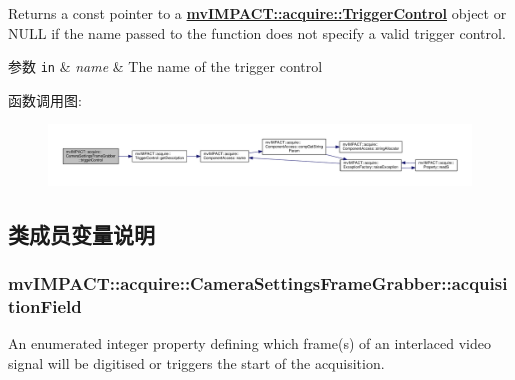 Returns a const pointer to a {\bfseries \hyperlink{classmv_i_m_p_a_c_t_1_1acquire_1_1_trigger_control}{mv\+I\+M\+P\+A\+C\+T\+::acquire\+::\+Trigger\+Control}} object or N\+U\+L\+L if the name passed to the function does not specify a valid trigger control. 


\begin{DoxyParams}[1]{参数}
\mbox{\tt in}  & {\em name} & The name of the trigger control \\
\hline
\end{DoxyParams}


函数调用图\+:
\nopagebreak
\begin{figure}[H]
\begin{center}
\leavevmode
\includegraphics[width=350pt]{classmv_i_m_p_a_c_t_1_1acquire_1_1_camera_settings_frame_grabber_a49074adbc4794944fd3cda354cdeb599_cgraph}
\end{center}
\end{figure}




\subsection{类成员变量说明}
\hypertarget{classmv_i_m_p_a_c_t_1_1acquire_1_1_camera_settings_frame_grabber_ad60c4e0bf3ad80348a10061140dcb57c}{
\subsubsection[{acquisition\+Field}]{ mv\+I\+M\+P\+A\+C\+T\+::acquire\+::\+Camera\+Settings\+Frame\+Grabber\+::acquisition\+Field}}\label{classmv_i_m_p_a_c_t_1_1acquire_1_1_camera_settings_frame_grabber_ad60c4e0bf3ad80348a10061140dcb57c}


An enumerated integer property defining which frame(s) of an interlaced video signal will be digitised or triggers the start of the acquisition. 

